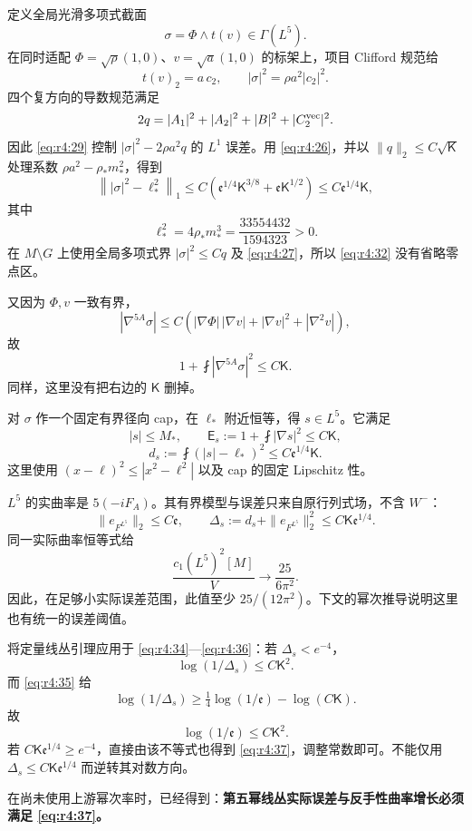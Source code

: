 \documentclass[UTF8,11pt,openany,oneside,fontset=none]{ctexbook}
\begin{document}
定义全局光滑多项式截面 \[
\sigma=\Phi\wedge t(v)\in\Gamma(L^5).
\tag{4.30}\label{eq:r4:30}
\] 在同时适配 \(\Phi=\sqrt\rho(1,0)\)、\(v=\sqrt a(1,0)\) 的标架上，项目 Clifford 规范给 \[
t(v)_2=a\,c_2,
\qquad |\sigma|^2=\rho a^2|c_2|^2.
\tag{4.31}\label{eq:r4:31}
\] 四个复方向的导数规范满足 \[
2q=|A_1|^2+|A_2|^2+|B|^2+|C_2^{\rm vec}|^2.
\] 因此 \eqref{eq:r4:29} 控制 \(|\sigma|^2-2\rho a^2q\) 的 \(L^1\) 误差。用 \eqref{eq:r4:26}，并以 \(\|q\|_2\le C\sqrt{\mathsf K}\) 处理系数 \(\rho a^2-\rho_*m_*^2\)，得到 \[
\left\||\sigma|^2-\ell_*^2\right\|_1
\le C\left(\mathfrak e^{1/4}\mathsf K^{3/8}
+\mathfrak e\mathsf K^{1/2}\right)
\le C\mathfrak e^{1/4}\mathsf K,
\tag{4.32}\label{eq:r4:32}
\] 其中 \[
\ell_*^2=4\rho_*m_*^3=\frac{33554432}{1594323}>0.
\] 在 \(M\setminus G\) 上使用全局多项式界 \(|\sigma|^2\le Cq\) 及 \eqref{eq:r4:27}，所以 \eqref{eq:r4:32} 没有省略零点区。

又因为 \(\Phi,v\) 一致有界， \[
|\nabla^{5A}\sigma|
\le C\left(|\nabla\Phi|\,|\nabla v|
+|\nabla v|^2+|\nabla^2v|\right),
\] 故 \[
\boxed{1+\fint|\nabla^{5A}\sigma|^2\le C\mathsf K.}
\tag{4.33}\label{eq:r4:33}
\] 同样，这里没有把右边的 \(\mathsf K\) 删掉。

对 \(\sigma\) 作一个固定有界径向 cap，在 \(\ell_*\) 附近恒等，得 \(s\in L^5\)。它满足 \[
|s|\le M_*,\qquad
\mathsf E_s:=1+\fint|\nabla s|^2\le C\mathsf K,
\] \[
d_s:=\fint(|s|-\ell_*)^2
\le C\mathfrak e^{1/4}\mathsf K.
\tag{4.34}\label{eq:r4:34}
\] 这里使用 \((x-\ell)^2\le|x^2-\ell^2|\) 以及 cap 的固定 Lipschitz 性。

\(L^5\) 的实曲率是 \(5(-iF_A)\)。其有界模型与误差只来自原行列式场，不含 \(W^-\)： \[
\|e_{F^{L^5}}\|_2\le C\mathfrak e,
\qquad
\Delta_s:=d_s+\|e_{F^{L^5}}\|_2^2
\le C\mathsf K\mathfrak e^{1/4}.
\tag{4.35}\label{eq:r4:35}
\] 同一实际曲率恒等式给 \[
\frac{c_1(L^5)^2[M]}V\longrightarrow\frac{25}{6\pi^2}.
\tag{4.36}\label{eq:r4:36}
\] 因此，在足够小实际误差范围，此值至少 \(25/(12\pi^2)\)。下文的幂次推导说明这里也有统一的误差阈值。

将定量线丛引理应用于 \eqref{eq:r4:34}---\eqref{eq:r4:36}：若 \(\Delta_s<e^{-4}\)， \[
\log(1/\Delta_s)\le C\mathsf K^2.
\] 而 \eqref{eq:r4:35} 给 \[
\log(1/\Delta_s)\ge\tfrac14\log(1/\mathfrak e)-\log(C\mathsf K).
\] 故 \[
\boxed{\log(1/\mathfrak e)\le C\mathsf K^2.}
\tag{4.37}\label{eq:r4:37}
\] 若 \(C\mathsf K\mathfrak e^{1/4}\ge e^{-4}\)，直接由该不等式也得到 \eqref{eq:r4:37}，调整常数即可。不能仅用 \(\Delta_s\le C\mathsf K\mathfrak e^{1/4}\) 而逆转其对数方向。

在尚未使用上游幂次率时，已经得到：\textbf{第五幂线丛实际误差与反手性曲率增长必须满足 \eqref{eq:r4:37}。}
\end{document}
